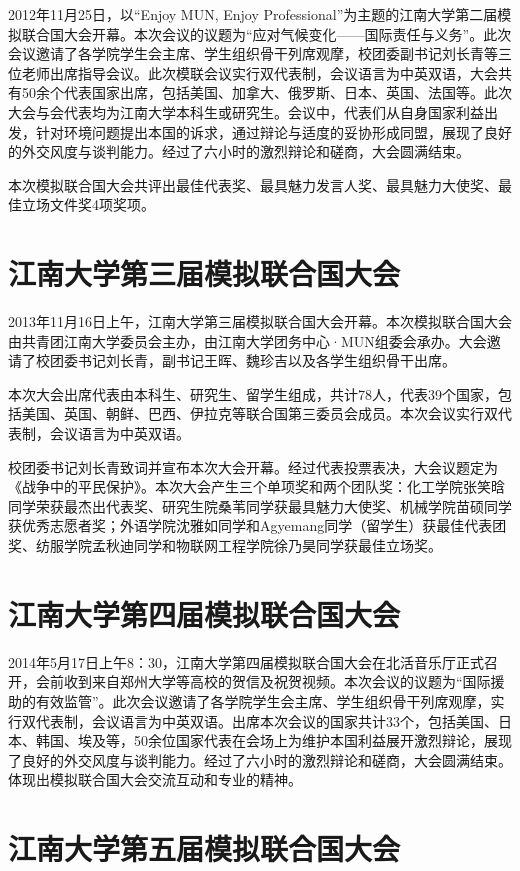\documentclass[a4paper,openany]{book}
\begin{document}
2012年11月25日，以“Enjoy MUN, Enjoy Professional”为主题的江南大学第二届模拟联合国大会开幕。本次会议的议题为“应对气候变化——国际责任与义务”。此次会议邀请了各学院学生会主席、学生组织骨干列席观摩，校团委副书记刘长青等三位老师出席指导会议。此次模联会议实行双代表制，会议语言为中英双语，大会共有50余个代表国家出席，包括美国、加拿大、俄罗斯、日本、英国、法国等。此次大会与会代表均为江南大学本科生或研究生。会议中，代表们从自身国家利益出发，针对环境问题提出本国的诉求，通过辩论与适度的妥协形成同盟，展现了良好的外交风度与谈判能力。经过了六小时的激烈辩论和磋商，大会圆满结束。

本次模拟联合国大会共评出最佳代表奖、最具魅力发言人奖、最具魅力大使奖、最佳立场文件奖4项奖项。

\section{江南大学第三届模拟联合国大会}

2013年11月16日上午，江南大学第三届模拟联合国大会开幕。本次模拟联合国大会由共青团江南大学委员会主办，由江南大学团务中心·MUN组委会承办。大会邀请了校团委书记刘长青，副书记王晖、魏珍吉以及各学生组织骨干出席。

本次大会出席代表由本科生、研究生、留学生组成，共计78人，代表39个国家，包括美国、英国、朝鲜、巴西、伊拉克等联合国第三委员会成员。本次会议实行双代表制，会议语言为中英双语。

校团委书记刘长青致词并宣布本次大会开幕。经过代表投票表决，大会议题定为《战争中的平民保护》。本次大会产生三个单项奖和两个团队奖：化工学院张笑晗同学荣获最杰出代表奖、研究生院桑苇同学获最具魅力大使奖、机械学院苗硕同学获优秀志愿者奖；外语学院沈雅如同学和Agyemang同学（留学生）获最佳代表团奖、纺服学院孟秋迪同学和物联网工程学院徐乃昊同学获最佳立场奖。

\section{江南大学第四届模拟联合国大会}

2014年5月17日上午8：30，江南大学第四届模拟联合国大会在北活音乐厅正式召开，会前收到来自郑州大学等高校的贺信及祝贺视频。本次会议的议题为“国际援助的有效监管”。此次会议邀请了各学院学生会主席、学生组织骨干列席观摩，实行双代表制，会议语言为中英双语。出席本次会议的国家共计33个，包括美国、日本、韩国、埃及等，50余位国家代表在会场上为维护本国利益展开激烈辩论，展现了良好的外交风度与谈判能力。经过了六小时的激烈辩论和磋商，大会圆满结束。体现出模拟联合国大会交流互动和专业的精神。

\section{江南大学第五届模拟联合国大会}
\end{document}
